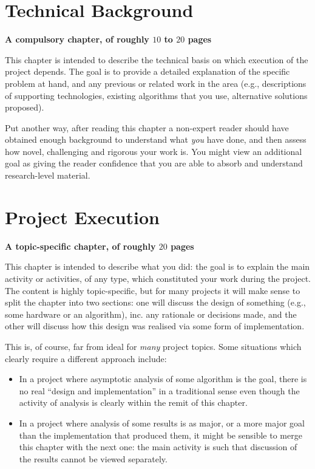 \documentclass[ %
                    author={Luke Murray},
                supervisor={Dr. Simon Hollis},
                     title={Shadow Peer-to-Peer Networks},
                  subtitle={},
                    degree={MEng},
                      year={2013} ]{thesis}
\begin{document}
\chapter{Technical Background}
\label{chap:technical}

{\bf A compulsory chapter, of roughly $10$ to $20$ pages} 
\vspace{1cm} 

\noindent
This chapter is intended to describe the technical basis on which execution
of the project depends.  The goal is to provide a detailed explanation of
the specific problem at hand, and any previous or related work in the area 
(e.g., descriptions of supporting technologies, existing algorithms that 
you use, alternative solutions proposed).  

Put another way, after reading this chapter a non-expert reader should have 
obtained enough background to understand what {\em you} have done, and then
assess how novel, challenging and rigorous your work is.  You might view an 
additional goal as giving the reader confidence that you are able to absorb 
and understand research-level material.


\chapter{Project Execution}
\label{chap:execution}

{\bf A topic-specific chapter, of roughly $20$ pages} 
\vspace{1cm} 

\noindent
This chapter is intended to describe what you did: the goal is to explain
the main activity or activities, of any type, which constituted your work 
during the project.  The content is highly topic-specific, but for many 
projects it will make sense to split the chapter into two sections: one 
will discuss the design of something (e.g., some hardware or an algorithm), 
inc. any rationale or decisions made, and the other will discuss how this 
design was realised via some form of implementation.  

This is, of course, far from ideal for {\em many} project topics.  Some
situations which clearly require a different approach include:

\begin{itemize}
\item In a project where asymptotic analysis of some algorithm is the goal,
      there is no real ``design and implementation'' in a traditional sense
      even though the activity of analysis is clearly within the remit of
      this chapter.
\item In a project where analysis of some results is as major, or a more
      major goal than the implementation that produced them, it might be
      sensible to merge this chapter with the next one: the main activity 
      is such that discussion of the results cannot be viewed separately.
\end{itemize}
\end{document}
